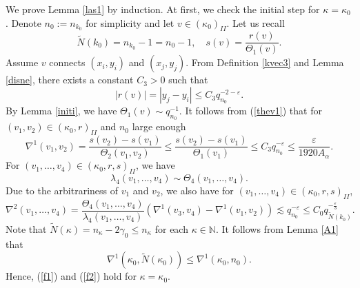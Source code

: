 \documentclass{amsart}
\theoremstyle{definition}
\begin{document}
We prove Lemma \ref{las1} by induction. At first, we  check the initial step for $\kappa=\kappa_0$. Denote $n_0:=n_{k_0}$ for simplicity and let $v\in (\kappa_0)_{II}$. Let us recall
\[\tilde{N}(k_0)=n_{k_0}-1=n_0-1,\quad s(v)=\frac{r(v)}{\Theta_1(v)}.\] Assume $v$ connects $(x_i,y_i)$ and $(x_j,y_j)$. From Definition \ref{kvec3} and Lemma \ref{disne}, there exists a constant $C_3>0$ such that
\begin{equation}\label{resaa}|r(v)|=|y_j-y_i|\leq C_3q_{n_0}^{-2-\varepsilon}.
\end{equation} By Lemma \ref{initi}, we have $\Theta_1(v)\sim q_{n_0}^{-1}$.
It follows from (\ref{thev1}) that for $(v_1,v_2)\in (\kappa_0, r)_{II}$ and $n_0$ large enough
\begin{equation}\label{wang1}
\nabla^1(v_1,v_2)=\frac{s(v_2)-s(v_1)}{\Theta_2(v_1,v_2)}\leq \frac{s(v_2)-s(v_1)}{\Theta_1(v_1)}\leq C_3 q_{n_0}^{-\varepsilon}\leq \frac{\varepsilon}{1920A_\alpha}.
\end{equation}
For $(v_1,\ldots,v_4)\in (\kappa_0,r,s)_{II}$, we have
\[\lambda_4(v_1,\ldots,v_4)\sim \Theta_4(v_1,\ldots,v_4).\]
Due to the arbitrariness of $v_1$ and $v_2$, we also have for $(v_1,\ldots,v_4)\in (\kappa_0,r,s)_{II}$,
\[\nabla^2(v_1,\ldots,v_4)=\frac{\Theta_4(v_1,\ldots,v_4)}{\lambda_4(v_1,\ldots,v_4)}(\nabla^1(v_3,v_4)-\nabla^1(v_1,v_2))\lesssim q_{n_0}^{-\varepsilon}\leq C_0 q_{\tilde{N}(k_0)}^{-\frac{\varepsilon}{3}}.\]
Note that $\tilde{N}(\kappa)=n_\kappa-2\gamma_0\leq n_\kappa$ for each $\kappa\in \mathbb{N}$. It follows from Lemma \ref{A1} that \[\nabla^1(\kappa_0,\tilde{N}(\kappa_0))\leq \nabla^1(\kappa_0,n_0).\] Hence, (\ref{f1}) and (\ref{f2}) hold for $\kappa=\kappa_0$.
\end{document}
